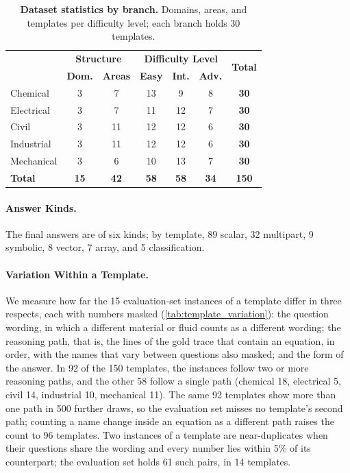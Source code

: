 \begin{table}[t]
    \centering
    \small
    \setlength{\tabcolsep}{3.5pt}
    \begin{tabular}{l|cc|ccc|c}
        \toprule
        \rowcolor{gray!10}
        \multirow{2}{*}{\textbf{Branch}} & \multicolumn{2}{c|}{\textbf{Structure}} & \multicolumn{3}{c|}{\textbf{Difficulty Level}} & \multirow{2}{*}{\textbf{Total}} \\
        & \textbf{Dom.} & \textbf{Areas} & \textbf{Easy} & \textbf{Int.} & \textbf{Adv.} & \\
        \midrule
        Chemical & 3 & 7 & 13 & 9 & 8 & \textbf{30} \\
        Electrical & 3 & 7 & 11 & 12 & 7 & \textbf{30} \\
        Civil & 3 & 11 & 12 & 12 & 6 & \textbf{30} \\
        Industrial & 3 & 11 & 12 & 12 & 6 & \textbf{30} \\
        Mechanical & 3 & 6 & 10 & 13 & 7 & \textbf{30} \\
        \midrule
        \textbf{Total} & \textbf{15} & \textbf{42} & \textbf{58} & \textbf{58} & \textbf{34} & \textbf{150} \\
        \bottomrule
    \end{tabular}
    \caption{\textbf{Dataset statistics by branch.} Domains, areas, and templates per difficulty
    level; each branch holds 30 templates.}
    \label{tab:difficulty_stats}
\end{table}

\paragraph{Answer Kinds.}
The final answers are of six kinds; by template, 89 scalar, 32 multipart, 9 symbolic, 8 vector,
7 array, and 5 classification.

\paragraph{Variation Within a Template.}
We measure how far the 15 evaluation-set instances of a template differ in three respects, each with
numbers masked (\autoref{tab:template_variation}): the question wording, in which a different
material or fluid counts as a different wording; the reasoning path, that is, the lines of the gold
trace that contain an equation, in order, with the names that vary between questions also masked;
and the form of the answer.
In 92 of the 150 templates, the instances follow two or more reasoning paths, and the other 58
follow a single path (chemical 18, electrical 5, civil 14, industrial 10, mechanical 11).
The same 92 templates show more than one path in 500 further draws, so the evaluation set misses no
template's second path; counting a name change inside an equation as a different path raises the
count to 96 templates.
Two instances of a template are near-duplicates when their questions share the wording and every
number lies within 5\% of its counterpart; the evaluation set holds 61 such pairs, in 14 templates.

